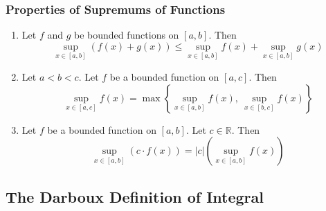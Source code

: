 \documentclass[10pt]{article}
\def\R{{\mathbb R}}
\begin{document}
\subsubsection{Properties of Supremums of Functions}
\begin{enumerate}
    \item Let $f$ and $g$ be bounded functions on $[a,b]$. Then
          $$
              \sup_{x\in[a,b]} (f(x)+g(x)) \leq \sup_{x\in[a,b]} f(x) + \sup_{x\in[a,b]} g(x)
          $$
    \item Let $a<b<c$. Let $f$ be a bounded function on $[a,c]$. Then
          $$
              \sup_{x\in[a,c]} f(x)=\max\left\{\sup_{x\in[a,b]} f(x),~\sup_{x\in[b,c]} f(x) \right\}
          $$
    \item Let $f$ be a bounded function on $[a,b]$. Let $c\in\R$. Then
          $$
              \sup_{x\in[a,b]} (c\cdot f(x)) = |c|\left(\sup_{x\in[a,b]} f(x)\right)
          $$
\end{enumerate}
\subsection{The Darboux Definition of Integral}
\end{document}
